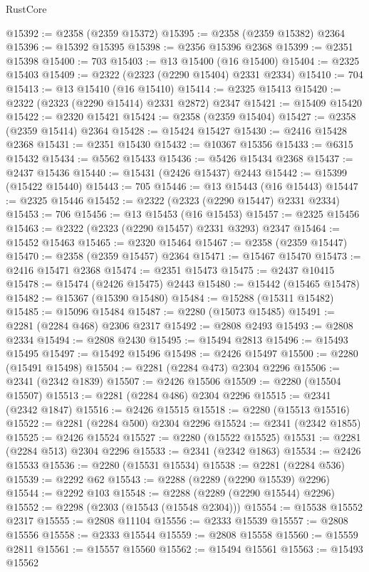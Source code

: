 \begin{lexlean}{RustCore}
\begin{coremodule}
@15392 := @2358 (@2359 @15372)
@15395 := @2358 (@2359 @15382) @2364
@15396 := @15392 @15395
@15398 := @2356 @15396 @2368
@15399 := @2351 @15398
@15400 := 703
@15403 := @13 @15400 (@16 @15400)
@15404 := @2325 @15403
@15409 := @2322 (@2323 (@2290 @15404) @2331 @2334)
@15410 := 704
@15413 := @13 @15410 (@16 @15410)
@15414 := @2325 @15413
@15420 := @2322 (@2323 (@2290 @15414) @2331 @2872) @2347
@15421 := @15409 @15420
@15422 := @2320 @15421
@15424 := @2358 (@2359 @15404)
@15427 := @2358 (@2359 @15414) @2364
@15428 := @15424 @15427
@15430 := @2416 @15428 @2368
@15431 := @2351 @15430
@15432 := @10367 @15356
@15433 := @6315 @15432
@15434 := @5562 @15433
@15436 := @5426 @15434 @2368
@15437 := @2437 @15436
@15440 := @15431 (@2426 @15437) @2443
@15442 := @15399 (@15422 @15440)
@15443 := 705
@15446 := @13 @15443 (@16 @15443)
@15447 := @2325 @15446
@15452 := @2322 (@2323 (@2290 @15447) @2331 @2334)
@15453 := 706
@15456 := @13 @15453 (@16 @15453)
@15457 := @2325 @15456
@15463 := @2322 (@2323 (@2290 @15457) @2331 @3293) @2347
@15464 := @15452 @15463
@15465 := @2320 @15464
@15467 := @2358 (@2359 @15447)
@15470 := @2358 (@2359 @15457) @2364
@15471 := @15467 @15470
@15473 := @2416 @15471 @2368
@15474 := @2351 @15473
@15475 := @2437 @10415
@15478 := @15474 (@2426 @15475) @2443
@15480 := @15442 (@15465 @15478)
@15482 := @15367 (@15390 @15480)
@15484 := @15288 (@15311 @15482)
@15485 := @15096 @15484
@15487 := @2280 (@15073 @15485)
@15491 := @2281 (@2284 @468) @2306 @2317
@15492 := @2808 @2493
@15493 := @2808 @2334
@15494 := @2808 @2430
@15495 := @15494 @2813
@15496 := @15493 @15495
@15497 := @15492 @15496
@15498 := @2426 @15497
@15500 := @2280 (@15491 @15498)
@15504 := @2281 (@2284 @473) @2304 @2296
@15506 := @2341 (@2342 @1839)
@15507 := @2426 @15506
@15509 := @2280 (@15504 @15507)
@15513 := @2281 (@2284 @486) @2304 @2296
@15515 := @2341 (@2342 @1847)
@15516 := @2426 @15515
@15518 := @2280 (@15513 @15516)
@15522 := @2281 (@2284 @500) @2304 @2296
@15524 := @2341 (@2342 @1855)
@15525 := @2426 @15524
@15527 := @2280 (@15522 @15525)
@15531 := @2281 (@2284 @513) @2304 @2296
@15533 := @2341 (@2342 @1863)
@15534 := @2426 @15533
@15536 := @2280 (@15531 @15534)
@15538 := @2281 (@2284 @536)
@15539 := @2292 @62
@15543 := @2288 (@2289 (@2290 @15539) @2296)
@15544 := @2292 @103
@15548 := @2288 (@2289 (@2290 @15544) @2296)
@15552 := @2298 (@2303 (@15543 (@15548 @2304)))
@15554 := @15538 @15552 @2317
@15555 := @2808 @11104
@15556 := @2333 @15539
@15557 := @2808 @15556
@15558 := @2333 @15544
@15559 := @2808 @15558
@15560 := @15559 @2811
@15561 := @15557 @15560
@15562 := @15494 @15561
@15563 := @15493 @15562

\end{coremodule}
\end{lexlean}
